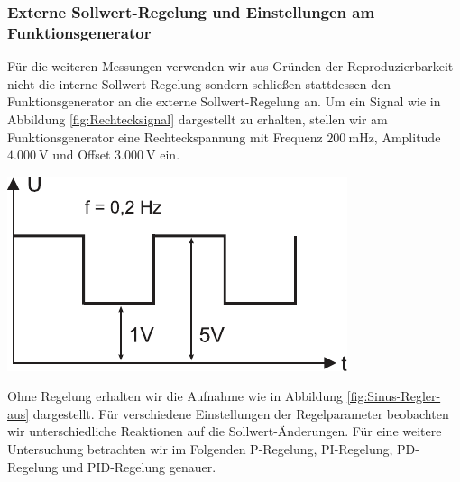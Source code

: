 \subsubsection*{Externe Sollwert-Regelung und Einstellungen am Funktionsgenerator}
%
Für die weiteren Messungen verwenden wir aus Gründen der Reproduzierbarkeit nicht die interne Sollwert-Regelung sondern schließen stattdessen den Funktionsgenerator an die externe Sollwert-Regelung an.
Um ein Signal wie in Abbildung \ref{fig:Rechtecksignal} dargestellt zu erhalten, stellen wir am Funktionsgenerator eine Rechteckspannung mit Frequenz $\SI{200}{\milli\hertz}$, Amplitude $\SI{4,000}{\volt}$ und Offset $\SI{3,000}{\volt}$ ein.
%
\par
%
\minipage{\linewidth}
    \begin{center}
        \captionsetup{type=figure}
        \begin{adjustbox}{max width=\linewidth, keepaspectratio}
            \includegraphics[]{pdf/Rechtecksignal}
        \end{adjustbox}
        \label{fig:Rechtecksignal}
    \end{center}
\endminipage
%
\par
%
Ohne Regelung erhalten wir die Aufnahme wie in Abbildung \ref{fig:Sinus-Regler-aus} dargestellt.
Für verschiedene Einstellungen der Regelparameter beobachten wir unterschiedliche Reaktionen auf die Sollwert-Änderungen.
Für eine weitere Untersuchung betrachten wir im Folgenden P-Regelung, PI-Regelung, PD-Regelung und PID-Regelung genauer.
%
\par
%
\minipage{\linewidth}
